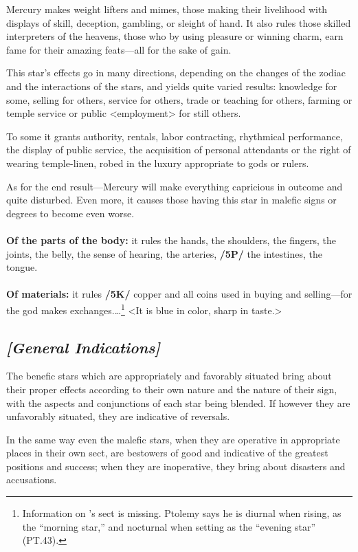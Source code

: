 Mercury makes weight lifters and mimes, those making their livelihood with displays of skill, deception, gambling, or sleight of hand. It also rules those skilled interpreters of the heavens, those who by using pleasure or winning charm, earn fame for their amazing feats—all for the sake of gain. 

\mndl[0.2cm]
This star’s effects go in many directions, depending on the changes of the zodiac and the interactions of the stars, and yields quite varied results: knowledge for some, selling for others, service for others, trade or teaching for others, farming or temple service or public <employment> for still others. 

To some it grants authority, rentals, labor contracting, rhythmical performance, the display of public service,
the acquisition of personal attendants or the right of wearing temple-linen, robed in the luxury appropriate
to gods or rulers. 

\mndl[0.2cm]
As for the end result—Mercury will make everything capricious in outcome and quite disturbed. Even more, it causes those having this star in malefic signs or degrees to become even worse. \\
\\
\textbf{Of the parts of the body:} it rules the hands, the shoulders, the fingers, the joints, the belly, the sense of hearing, the arteries, \textbf{/5P/} the intestines, the tongue. \\
\\
\textbf{Of materials:} it rules \textbf{/5K/} copper and all coins used in buying and selling—for the god makes exchanges.\ldots\footnote{Information on \Mercury's sect is missing. Ptolemy says he is diurnal when rising, as the ``morning star,'' and nocturnal when setting as the ``evening star'' (PT.43).} <It is blue in color, sharp in taste.>

\secbr
\subsection{\textit{[General Indications]}}
\mndl[0.2cm]
The  benefic stars  which are appropriately and favorably situated bring about their proper effects according to their own nature and the nature of their sign, with the aspects and conjunctions of each star being blended. If however they are unfavorably situated, they are indicative of reversals. 

\mnmb[0.2cm] 
In the same way even the  malefic stars, when they are operative in appropriate places in their own sect, are bestowers of good and indicative of the greatest positions and success; when they are inoperative, they bring about disasters and accusations.

